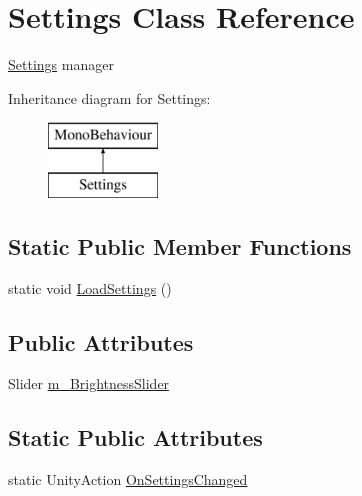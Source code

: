 \hypertarget{class_settings}{}\section{Settings Class Reference}
\label{class_settings}


\mbox{\hyperlink{class_settings}{Settings}} manager  


Inheritance diagram for Settings\+:\begin{figure}[H]
\begin{center}
\leavevmode
\includegraphics[height=2.000000cm]{class_settings}
\end{center}
\end{figure}
\subsection*{Static Public Member Functions}
\begin{DoxyCompactItemize}
\item 
static void \mbox{\hyperlink{class_settings_a7189b690954cfc6feb994aeb230c39f8}{Load\+Settings}} ()
\end{DoxyCompactItemize}
\subsection*{Public Attributes}
\begin{DoxyCompactItemize}
\item 
Slider \mbox{\hyperlink{class_settings_a89d00fb20c50b9bdb03626db93188cb8}{m\+\_\+\+Brightness\+Slider}}
\end{DoxyCompactItemize}
\subsection*{Static Public Attributes}
\begin{DoxyCompactItemize}
\item 
static Unity\+Action \mbox{\hyperlink{class_settings_a59592454124f45eece38b211b6214444}{On\+Settings\+Changed}}
\end{DoxyCompactItemize}
